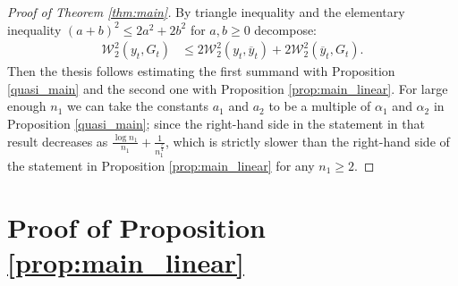 \documentclass{article}
\theoremstyle{definition}
\theoremstyle{remark}
\numberwithin{equation}{section}
\begin{document}
\begin{proof}[Proof of Theorem \ref{thm:main}]
    By triangle inequality and the elementary inequality $(a+b)^2\le 2a^2+2b^2$ for $a,b\ge 0$ decompose:
    \begin{align}
        \mathcal W_2^2(y_t,G_t) &\le 2\mathcal W_2^2(y_t,\overline y_t) + 2\mathcal W_2^2(\overline y_t,G_t).
    \end{align}
    Then the thesis follows estimating the first summand with Proposition \ref{quasi_main} and the second one with Proposition \ref{prop:main_linear}.
    For large enough $n_1$ we can take the constants $a_1$ and $a_2$ to be a multiple of $\alpha_1$ and $\alpha_2$ in Proposition \ref{quasi_main}; 
    since the right-hand side in the statement in that result decreases as $\frac{\log n_1}{n_1} + \frac{1}{n_1^\frac{r}{4}}$, 
    which is strictly slower than the right-hand side of the statement in Proposition \ref{prop:main_linear} for any $n_1 \ge 2$.
\end{proof}

\section{Proof of Proposition \ref{prop:main_linear}}
\label{ap:proof_2}
\end{document}
